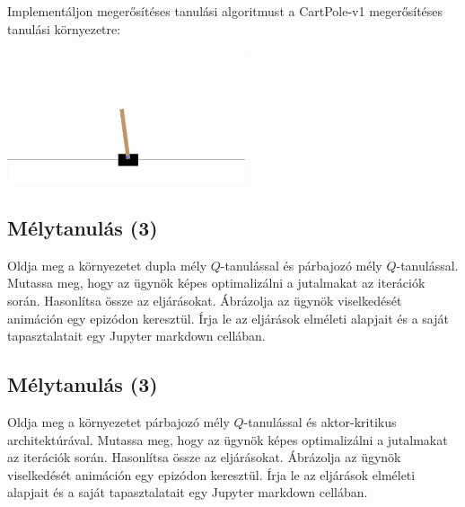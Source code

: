 \documentclass[english]{article}
\begin{document}
Implementáljon megerősítéses tanulási algoritmust a CartPole-v1 megerősítéses tanulási környezetre:

\begin{center}
\includegraphics[width=7cm, keepaspectratio]{images/cartpole.jpg}
\end{center}

\subsection{Mélytanulás (3)}

Oldja meg a környezetet dupla mély $Q$-tanulással és párbajozó mély $Q$-tanulással. Mutassa meg, hogy az ügynök képes optimalizálni a jutalmakat az iterációk során. Hasonlítsa össze az eljárásokat. Ábrázolja az ügynök viselkedését animáción egy epizódon keresztül. Írja le az eljárások elméleti alapjait és a saját tapasztalatait egy Jupyter markdown cellában. 

\subsection{Mélytanulás (3)}

Oldja meg a környezetet párbajozó mély $Q$-tanulással és aktor-kritikus architektúrával. Mutassa meg, hogy az ügynök képes optimalizálni a jutalmakat az iterációk során. Hasonlítsa össze az eljárásokat. Ábrázolja az ügynök viselkedését animáción egy epizódon keresztül. Írja le az eljárások elméleti alapjait és a saját tapasztalatait egy Jupyter markdown cellában. 
\end{document}
